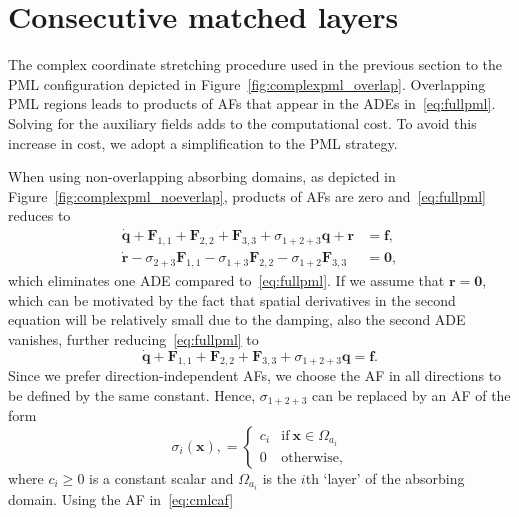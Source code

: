 \documentclass[a4paper]{article}
\renewcommand{\vec}{\boldsymbol}
\begin{document}
\section{Consecutive matched layers}
\label{sec:cml}

The complex coordinate stretching procedure used in the previous
section to the PML configuration depicted in
Figure~\ref{fig:complexpml_overlap}. Overlapping PML regions leads to
products of AFs that appear in the ADEs in~\eqref{eq:fullpml}. Solving
for the auxiliary fields adds to the computational cost.  To avoid
this increase in cost, we adopt a simplification to the PML strategy.

When using non-overlapping absorbing domains, as depicted in
Figure~\ref{fig:complexpml_noeverlap}, products of AFs are zero
and~\eqref{eq:fullpml} reduces to
\begin{equation}
  \begin{aligned}
    \Dot{\vec{q}}  + \vec{F}_{1,1} + \vec{F}_{2,2} + \vec{F}_{3,3}
    + \sigma_{1+2+3}\vec{q} +\vec{r} &= \vec{f},
    \\
    \Dot{\vec{r}} - \sigma_{2+3} \vec{F}_{1, 1} - \sigma_{1+3} \vec{F}_{2,2}
    - \sigma_{1+2}\vec{F}_{3, 3} &= \vec{0},
  \end{aligned}
  \label{eq:earlycml}
\end{equation}
which eliminates one ADE compared to~\eqref{eq:fullpml}. If we assume
that $\vec{r} = \vec{0}$, which can be motivated by the fact that
spatial derivatives in the second equation will be relatively small
due to the damping, also the second ADE vanishes, further
reducing~\eqref{eq:fullpml} to
\begin{equation}
  \Dot{\vec{q}} + \vec{F}_{1,1} + \vec{F}_{2,2} + \vec{F}_{3,3}
  + \sigma_{1+2+3}\vec{q} = \vec{f}.
  \label{eq:earlycml2}
\end{equation}
Since we prefer direction-independent AFs, we choose the AF in all
directions to be defined by the same constant. Hence, $\sigma_{1+2+3}$
can be replaced by an AF of the form
\begin{equation}
  \sigma_{i}(\vec{x}),
  =
  \begin{cases}
    c_i & \text{if} \ \vec{x} \in \Omega_{a_i}
    \\
    0     & \text{otherwise},
  \end{cases}
\label{eq:cmlcaf}
\end{equation}
where $c_i \ge 0$ is a constant scalar and $\Omega_{a_i}$ is the $i$th
`layer' of the absorbing domain.  Using the AF in~\eqref{eq:cmlcaf}
\end{document}
